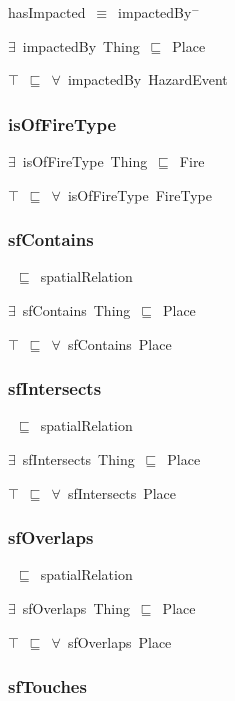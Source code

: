 \documentclass{article}
\begin{document}
hasImpacted~\ensuremath{\equiv}~impactedBy\ensuremath{^-}

\ensuremath{\exists}~impactedBy~Thing~\ensuremath{\sqsubseteq}~Place

\ensuremath{\top}~\ensuremath{\sqsubseteq}~\ensuremath{\forall}~impactedBy~HazardEvent

\subsubsection*{isOfFireType}

\ensuremath{\exists}~isOfFireType~Thing~\ensuremath{\sqsubseteq}~Fire

\ensuremath{\top}~\ensuremath{\sqsubseteq}~\ensuremath{\forall}~isOfFireType~FireType

\subsubsection*{sfContains}

~\ensuremath{\sqsubseteq}~spatialRelation

\ensuremath{\exists}~sfContains~Thing~\ensuremath{\sqsubseteq}~Place

\ensuremath{\top}~\ensuremath{\sqsubseteq}~\ensuremath{\forall}~sfContains~Place

\subsubsection*{sfIntersects}

~\ensuremath{\sqsubseteq}~spatialRelation

\ensuremath{\exists}~sfIntersects~Thing~\ensuremath{\sqsubseteq}~Place

\ensuremath{\top}~\ensuremath{\sqsubseteq}~\ensuremath{\forall}~sfIntersects~Place

\subsubsection*{sfOverlaps}

~\ensuremath{\sqsubseteq}~spatialRelation

\ensuremath{\exists}~sfOverlaps~Thing~\ensuremath{\sqsubseteq}~Place

\ensuremath{\top}~\ensuremath{\sqsubseteq}~\ensuremath{\forall}~sfOverlaps~Place

\subsubsection*{sfTouches}
\end{document}
